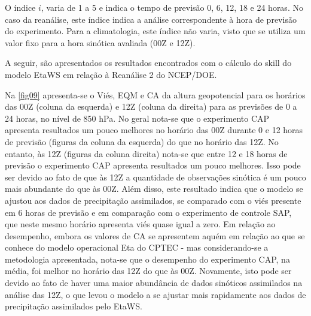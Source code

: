 O índice $i$, varia de 1 a 5 e indica o tempo de previsão 0, 6, 12, 18 e 24 horas. No caso da reanálise, este índice indica a análise correspondente à hora de previsão do experimento. Para a climatologia, este índice não varia, visto que se utiliza um valor fixo para a hora sinótica avaliada (00Z e 12Z).

A seguir, são apresentados os resultados encontrados com o cálculo do skill do modelo EtaWS em relação à Reanálise 2 do NCEP/DOE.

Na \autoref{fig09} apresenta-se o Viés, EQM e CA da altura geopotencial para os horários das 00Z (coluna da esquerda) e 12Z (coluna da direita) para as previsões de 0 a 24 horas, no nível de 850 hPa. No geral nota-se que o experimento CAP apresenta resultados um pouco melhores no horário das 00Z durante 0 e 12 horas de previsão (figuras da coluna da esquerda) do que no horário das 12Z. No entanto, às 12Z (figuras da coluna direita) nota-se que entre 12 e 18 horas de previsão o experimento CAP apresenta resultados um pouco melhores. Isso pode ser devido ao fato de que às 12Z a quantidade de observações sinótica é um pouco mais abundante do que às 00Z. Além disso, este resultado indica que o modelo se ajustou aos dados de precipitação assimilados, se comparado com o viés presente em 6 horas de previsão e em comparação com o experimento de controle SAP, que neste mesmo horário apresenta viés quase igual a zero. Em relação ao desempenho, embora os valores de CA se apresentem aquém em relação ao que se conhece do modelo operacional Eta do CPTEC - mas considerando-se a metodologia apresentada, nota-se que o desempenho do experimento CAP, na média, foi melhor no horário das 12Z do que às 00Z. Novamente, isto pode ser devido ao fato de haver uma maior abundância de dados sinóticos assimilados na análise das 12Z, o que levou o modelo a se ajustar mais rapidamente aos dados de precipitação assimilados pelo EtaWS.

